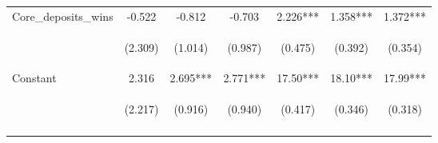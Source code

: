 \documentclass[]{article}
\begin{document}
\begin{center}
\begin{tabular}{lcccccc}
Core\_deposits\_wins & -0.522 & -0.812 & -0.703 & 2.226*** & 1.358*** & 1.372*** \\
\vspace{4pt} & \begin{footnotesize}(2.309)\end{footnotesize} & \begin{footnotesize}(1.014)\end{footnotesize} & \begin{footnotesize}(0.987)\end{footnotesize} & \begin{footnotesize}(0.475)\end{footnotesize} & \begin{footnotesize}(0.392)\end{footnotesize} & \begin{footnotesize}(0.354)\end{footnotesize} \\
Constant & 2.316 & 2.695*** & 2.771*** & 17.50*** & 18.10*** & 17.99*** \\
 & \begin{footnotesize}(2.217)\end{footnotesize} & \begin{footnotesize}(0.916)\end{footnotesize} & \begin{footnotesize}(0.940)\end{footnotesize} & \begin{footnotesize}(0.417)\end{footnotesize} & \begin{footnotesize}(0.346)\end{footnotesize} & \begin{footnotesize}(0.318)\end{footnotesize} \\
\vspace{4pt} & \begin{footnotesize}\end{footnotesize} & \begin{footnotesize}\end{footnotesize} & \begin{footnotesize}\end{footnotesize} & \begin{footnotesize}\end{footnotesize} & \begin{footnotesize}\end{footnotesize} & \begin{footnotesize}\end{footnotesize} \\

\end{tabular}
\end{center}
\end{document}
